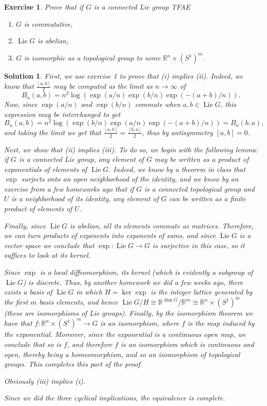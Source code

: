 \documentclass{article}
\newtheorem{ex}{Exercise}
\theoremstyle{nonumberplain}
\newtheorem{sol}{Solution}
\newcommand{\R}{\mathbb{R}}
\DeclareMathOperator{\Lie}{Lie}
\begin{document}
\begin{ex}
Prove that if $G$ is a connected Lie group TFAE
\begin{enumerate}
\item $G$ is commutative,
\item $\Lie G$ is abelian,
\item $G$ is isomorphic as a topological group to some $\R^n \times (S^1)^m$.
\end{enumerate}
\end{ex}

\begin{sol}
First, we use exercise 1 to prove that (i) implies (ii). Indeed, we know that $\frac{[a,b]}2$ may be computed as the limit as $n \to \infty$ of
\begin{equation}
B_n(a,b) = n^2 \log( \exp(a/n) \exp(b/n) \exp(-(a+b)/n) ).
\end{equation}
Now, since $\exp(a/n)$ and $\exp(b/n)$ commute when $a, b \in \Lie G$, this expression may be interchanged to get
\begin{equation}
B_n(a,b) = n^2 \log( \exp(b/n) \exp(a/n) \exp(-(a+b)/n) ) = B_n(b,a),
\end{equation}
and taking the limit we get that $\frac{[a,b]}2 = \frac{[b,a]}2$, thus by antisymmetry $[a,b] = 0$.

Next, we show that (ii) implies (iii). To do so, we begin with the following lemma: if $G$ is a connected Lie group, any element of $G$ may be written as a product of exponentials of elements of $\Lie G$. Indeed, we know by a theorem in class that $\exp$ surjects onto an open neighborhood of the identity, and we know by an exercise from a few homeworks ago that if $G$ is a connected topological group and $U$ is a neighborhood of its identity, any element of $G$ can be written as a finite product of elements of $U$.

Finally, since $\Lie G$ is abelian, all its elements commute as matrices. Therefore, we can turn products of exponents into exponents of sums, and since $\Lie G$ is a vector space we conclude that $\exp \colon \Lie G \to G$ is surjective in this case, so it suffices to look at its kernel.

Since $\exp$ is a local diffeomorphism, its kernel (which is evidently a subgroup of $\Lie G$) is discrete. Thus, by another homework we did a few weeks ago, there exists a basis of $\Lie G$ in which $H = \ker \exp$ is the integer lattice generated by the first $m$ basis elements, and hence $\Lie G / H \cong \R^{\dim G} / \R^m \cong \R^n \times (S^1)^m$ (these are isomorphisms of Lie groups). Finally, by the isomorphism theorem we have that $f \colon \R^n \times (S^1)^m \to G$ is an isomorphism, where $f$ is the map induced by the exponential. Moreover, since the exponential is a continuous open map, we conclude that so is $f$, and therefore $f$ is an isomorphism which is continuous and open, thereby being a homeomorphism, and so an isomorphism of topological groups. This completes this part of the proof.

\smallskip

Obviously (iii) implies (i).

\smallskip

Since we did the three cyclical implications, the equivalence is complete.
\end{sol}
\end{document}
